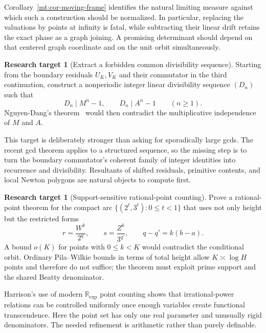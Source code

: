\documentclass[11pt,oneside]{article}
\theoremstyle{definition}
\newtheorem{target}[theorem]{Research target}
\theoremstyle{remark}
\newcommand{\R}{\mathbb R}
\begin{document}
Corollary~\ref{mt:cor-moving-frame} identifies the natural limiting measure against which such
a construction should be normalized.  In particular, replacing the valuations by points at
infinity is fatal, while subtracting their linear drift retains the exact phase as a graph
joining.  A promising determinant should depend on that centered graph coordinate and on the
unit orbit simultaneously.

\begin{target}[Extract a forbidden common divisibility sequence]
\label{mt:target-divisibility-sequence}
Starting from the boundary residuals $U_K,V_K$ and their commutator in the third continuation,
construct a nonperiodic integer linear divisibility sequence $(D_n)$ such that
\begin{equation}
 D_n\mid M^n-1,
 \qquad
 D_n\mid A^n-1
 \qquad(n\ge1).
 \label{mt:eq-common-LDS}
\end{equation}
Nguyen-Dang's theorem~\cite{NguyenDang2026} would then contradict the multiplicative
independence of $M$ and $A$.
\end{target}

This target is deliberately stronger than asking for sporadically large gcds.  The recent gcd
theorem applies to a structured sequence, so the missing step is to turn the boundary
commutator's coherent family of integer identities into recurrence and divisibility.  Resultants
of shifted residuals, primitive contents, and local Newton polygons are natural objects to
compute first.

\begin{target}[Support-sensitive rational-point counting]
\label{mt:target-support-pila}
Prove a rational-point theorem for the compact arc
$\{(2^t,3^t):0\le t<1\}$ that uses not only height but the restricted forms
\begin{equation}
 r=\frac{W^k}{2^q},
 \qquad
 s=\frac{Z^k}{3^{q'}},
 \qquad
 q-q'=k(b-a).
 \label{mt:eq-supported-points}
\end{equation}
A bound $o(K)$ for points with $0\le k<K$ would contradict the conditional orbit.  Ordinary
Pila--Wilkie bounds in terms of total height allow $K\asymp\log H$ points and therefore do not
suffice; the theorem must exploit prime support and the shared Beatty denominator.
\end{target}

Harrison's use of modern $\R_{\exp}$ point counting shows that irrational-power relations can
be controlled uniformly once enough variables create functional transcendence.  Here the
point set has only one real parameter and unusually rigid denominators.  The needed refinement
is arithmetic rather than purely definable.
\end{document}
